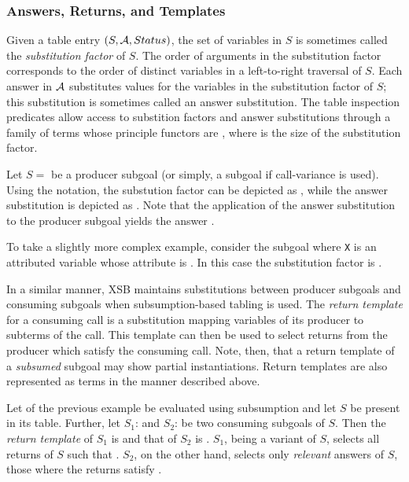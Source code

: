 
\subsubsection*{Answers, Returns, and Templates}

%
Given a table entry $(S,{\cal A},Status)$, the set of variables in $S$ is
sometimes called the {\em substitution factor} of $S$.  The order of
arguments in the substitution factor corresponds to the order of
distinct variables in a left-to-right traversal of $S$.  Each answer
in ${\cal A}$ substitutes values for the variables in the substitution
factor of $S$; this substitution is sometimes called an answer
substitution.  The table inspection predicates allow access to
substition factors and answer substitutions through a family of terms
whose principle functors are \retn, where  is the size of the
substitution factor.

\begin{example}
Let $S =$  be a producer subgoal (or simply, a subgoal
if call-variance is used).  Using the \retn notation, the substution
factor can be depicted as , while the answer
substitution  is depicted as .  Note
that the application of the answer substitution to the producer
subgoal yields the answer .

To take a slightly more complex example, consider the subgoal
 where {\tt X} is an attributed variable whose attribute is
.  In this case the substitution factor is
.\fillBox
\end{example}

In a similar manner, XSB maintains substitutions between producer
subgoals and consuming subgoals when subsumption-based tabling is
used.  The \emph{return template} for a consuming call is a
substitution mapping variables of its producer to subterms of the
call.  This template can then be used to select returns from the
producer which satisfy the consuming call.  Note, then, that a return
template of a \emph{subsumed} subgoal may show partial instantiations.
Return templates are also represented as \retn{} terms in the manner
described above.

\begin{example}
Let  of the previous example be evaluated using subsumption
and let $S$ be present in its table.  Further, let $S_1$:
 and $S_2$:  be two consuming
subgoals of $S$\@.  Then the \emph{return template} of $S_1$ is
 and that of $S_2$ is .  $S_1$, being
a variant of $S$, selects all returns of $S$ such that
\@.  $S_2$, on the other hand, selects only
\emph{relevant} answers of $S$, those where the returns satisfy
.\fillBox
\end{example}


